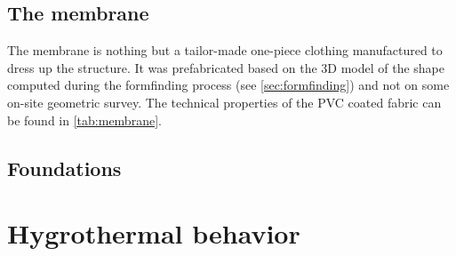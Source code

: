 %



\subsection{The membrane}

The membrane is nothing but a tailor-made one-piece clothing manufactured to dress up the structure. It was prefabricated based on the 3D model of the shape computed during the formfinding process (see \cref{sec:formfinding}) and not on some on-site geometric survey. The technical properties of the PVC coated fabric can be found in \cref{tab:membrane}.

\subsection{Foundations}

\section{Hygrothermal behavior}
